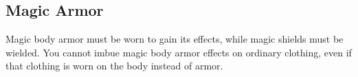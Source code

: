 

\begin{longcolumn}
  \section{Magic Armor}\label{Magic Armor}
    \begin{longtablepreface}
      Magic body armor must be worn to gain its effects, while magic shields must be wielded.
      You cannot imbue magic body armor effects on ordinary clothing, even if that clothing is worn on the body instead of armor.
    \end{longtablepreface}

    

\end{longcolumn}



